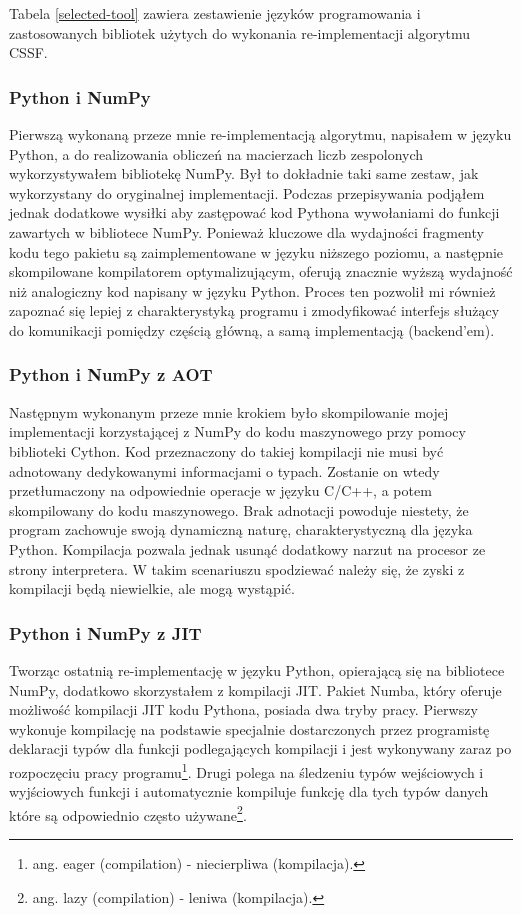 \documentclass[11pt, a4paper]{article}
\begin{document}
\begin{sloppypar}
    Tabela \ref{selected-tool} zawiera zestawienie języków programowania i zastosowanych
    bibliotek użytych do wykonania re-implementacji algorytmu CSSF.

    \subsubsection{Python i NumPy}
    Pierwszą wykonaną przeze mnie re-implementacją algorytmu, napisałem w języku Python,
    a do realizowania obliczeń na macierzach liczb zespolonych wykorzystywałem bibliotekę
    NumPy. Był to dokładnie taki same zestaw, jak wykorzystany do oryginalnej implementacji.
    Podczas przepisywania podjąłem jednak dodatkowe wysiłki aby zastępować kod Pythona
    wywołaniami do funkcji zawartych w bibliotece NumPy. Ponieważ kluczowe dla wydajności
    fragmenty kodu tego pakietu są zaimplementowane w języku niższego poziomu, a
    następnie skompilowane kompilatorem optymalizującym, oferują znacznie wyższą wydajność
    niż analogiczny kod napisany w języku Python. Proces ten pozwolił mi również
    zapoznać się lepiej z charakterystyką programu i zmodyfikować interfejs służący do
    komunikacji pomiędzy częścią główną, a samą implementacją (backend'em).

    \subsubsection{Python i NumPy z AOT}
    Następnym wykonanym przeze mnie krokiem było skompilowanie mojej implementacji korzystającej
    z NumPy do kodu maszynowego przy pomocy biblioteki Cython. Kod przeznaczony do
    takiej kompilacji nie musi być adnotowany dedykowanymi informacjami o typach. Zostanie
    on wtedy przetłumaczony na odpowiednie operacje w języku C/C++, a potem skompilowany
    do kodu maszynowego. Brak adnotacji powoduje niestety, że program zachowuje swoją
    dynamiczną naturę, charakterystyczną dla języka Python. Kompilacja pozwala jednak
    usunąć dodatkowy narzut na procesor ze strony interpretera. W takim scenariuszu spodziewać
    należy się, że zyski z kompilacji będą niewielkie, ale mogą wystąpić.

    \subsubsection{Python i NumPy z JIT}
    Tworząc ostatnią re-implementację w języku Python, opierającą się na bibliotece
    NumPy, dodatkowo skorzystałem z kompilacji JIT. Pakiet Numba, który oferuje możliwość
    kompilacji JIT kodu Pythona, posiada dwa tryby pracy. Pierwszy wykonuje kompilację na
    podstawie specjalnie dostarczonych przez programistę deklaracji typów dla funkcji podlegających
    kompilacji i jest wykonywany zaraz po rozpoczęciu pracy programu\footnote{ang. eager
    (compilation) - niecierpliwa (kompilacja).}. Drugi polega na śledzeniu typów
    wejściowych i wyjściowych funkcji i automatycznie kompiluje funkcję dla tych typów
    danych które są odpowiednio często używane\footnote{ang. lazy (compilation) - leniwa
    (kompilacja).}.


\end{sloppypar}
\end{document}

